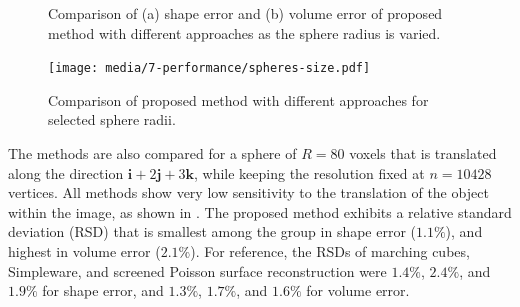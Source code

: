 \begin{figure}[b!]
	\centering
	\caption{Comparison of (a) shape error and (b) volume error of proposed method with different approaches as the sphere radius is varied.}
	\label{fig:graph2}
\end{figure}
\begin{figure}[t!]
	\centering
	\texttt{[image: media/7-performance/spheres-size.pdf]}
	\caption{Comparison of proposed method with different approaches for selected sphere radii.}
	\label{fig:demos2}
\end{figure}

The methods are also compared for a sphere of $R = 80$ voxels that is translated along the direction $\bm{i}  + 2\bm{j} + 3\bm{k}$, while keeping the resolution fixed at $n = 10428$ vertices.  All methods show very low sensitivity to the translation of the object within the image, as shown in . The proposed method exhibits a relative standard deviation (RSD) that is smallest among the group in shape error ($1.1\%$), and highest in volume error ($2.1\%$). For reference, the RSDs of marching cubes, Simpleware, and screened Poisson surface reconstruction were $1.4\%$, $2.4\%$, and $1.9\%$ for shape error, and $1.3\%$, $1.7\%$, and $1.6\%$ for volume error.

